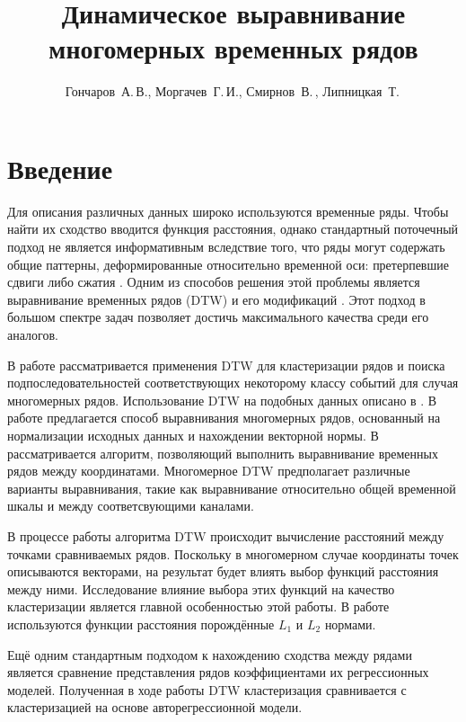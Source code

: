 \documentclass[12pt,twoside]{article}
\title
        {Динамическое выравнивание многомерных временных рядов}
\author
        {Гончаров~А.\,В., Моргачев~Г.\,И., Смирнов~В.\,, Липницкая~Т.\,} %
\begin{document}
    \maketitle
    \setcounter{secnumdepth}{3}
    \section{Введение}\label{intro}
        
        Для описания различных данных широко используются временные ряды.
        Чтобы найти их сходство вводится функция расстояния, однако стандартный поточечный подход не является информативным вследствие того,
        что ряды могут содержать общие паттерны, деформированные относительно временной оси: претерпевшие сдвиги либо сжатия \cite{01f4ab11a9ff49ff909094a135dcfe33}.
        Одним из способов решения этой проблемы является выравнивание временных рядов (DTW)  \cite{Keogh01derivativedynamic} и его модификаций \cite{journals/ida/SalvadorC07}.
        Этот подход в большом спектре задач позволяет достичь максимального качества среди его аналогов.
        
        В работе рассматривается применения DTW для кластеризации рядов и поиска подпоследовательностей
        соответствующих некоторому классу событий для случая многомерных рядов.
        Использование DTW на подобных данных описано в \cite{Holt2007,Sanguansat2012MultipleMS}.
        В работе \cite{Holt2007} предлагается способ выравнивания многомерных рядов, основанный на нормализации исходных данных и нахождении векторной нормы.
        В \cite{Sanguansat2012MultipleMS} рассматривается алгоритм, позволяющий выполнить выравнивание временных рядов между координатами. 
        Многомерное DTW предполагает различные варианты выравнивания, такие как выравнивание относительно общей временной шкалы и между соответсвующими каналами.
        
        В процессе работы алгоритма DTW происходит вычисление расстояний между точками сравниваемых рядов.
        Поскольку в многомерном случае координаты точек описываются векторами, на результат будет влиять выбор функций расстояния между ними.
        Исследование влияние выбора этих функций на качество кластеризации является главной особенностью этой работы.
        В работе используются функции расстояния порождённые $L_1$ и $L_2$ нормами.
        
        Ещё одним стандартным подходом к нахождению сходства между рядами является сравнение представления рядов коэффициентами их регрессионных моделей.
        Полученная в ходе работы DTW кластеризация сравнивается с кластеризацией на основе авторегрессионной модели.
    
\end{document}
